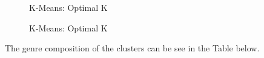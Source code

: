 \documentclass[conference]{IEEEtran}
\begin{document}
\begin{figure}[!ht]
    \begin{center}
    \end{center}
    \caption{K-Means: Optimal K}
    \label{fig:kmeans-elbow}
\end{figure}

\begin{figure}[!ht]
    \begin{center}
    \end{center}
    \caption{K-Means: Optimal K}
    \label{fig:kmeans-sil-viz}
\end{figure}

The genre composition of the clusters can be see in the Table below. 
\end{document}
